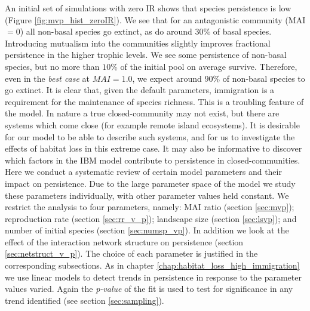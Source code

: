 An initial set of simulations with zero IR shows that species persistence is low (Figure \ref{fig:mvp_hist_zeroIR}). We see that for an antagonistic community (MAI$=0$) all non-basal species go extinct, as do around $30\%$ of basal species. Introducing mutualism into the communities slightly improves fractional persistence in the higher trophic levels. We see some persistence of non-basal species, but no more than $10\%$ of the initial pool on average survive. Therefore, even in the \emph{best case} at $MAI=1.0$, we expect around $90\%$ of non-basal species to go extinct. It is clear that, given the default parameters, immigration is a requirement for the maintenance of species richness. This is a troubling feature of the model. In nature a true closed-community may not exist, but there are systems which come close (for example remote island ecosystems). It is desirable for our model to be able to describe such systems, and for us to investigate the effects of habitat loss in this extreme case.  It may also be informative to discover which factors in the IBM model contribute to persistence in closed-communities. Here we conduct a systematic review of certain model parameters and their impact on persistence. Due to the large parameter space of the model we study these parameters individually, with other parameter values held constant. We restrict the analysis to four parameters, namely: MAI ratio (section \ref{sec:mvp}); reproduction rate (section \ref{sec:rr_v_p}); landscape size (section \ref{sec:lsvp}); and number of initial species (section \ref{sec:numsp_vp}). In addition we look at the effect of the interaction network structure on persistence (section \ref{sec:netstruct_v_p}). The choice of each parameter is justified in the corresponding subsections. As in chapter \ref{chap:habitat_loss_high_immigration} we use linear models to detect trends in persistence in response to the parameter values varied. Again the \emph{p-value} of the fit is used to test for significance in any trend identified (see section \ref{sec:sampling}). 



